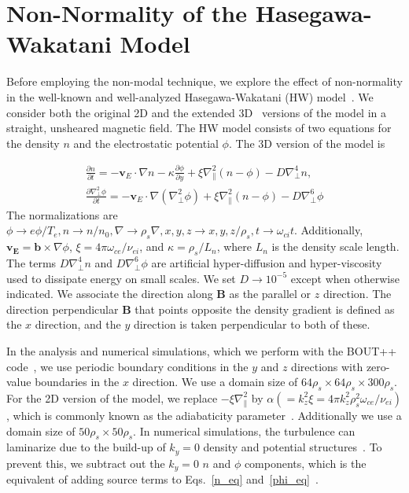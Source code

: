 \documentclass[letter,scriptaddress,twocolumn, prl,showkeys]{revtex4}
\def\beqar{\begin{eqnarray}}
\def\eeqar{\end{eqnarray}}
\newcommand{\pdiff}[2]{\frac{\partial#1}{\partial#2}}
\def\grad{\nabla}
\newcommand{\gradpar}{\grad_\parallel}
\newcommand{\gradperp}{\grad_\perp}
\begin{document}
\section{Non-Normality of the Hasegawa-Wakatani Model}

Before employing the non-modal technique, we explore the effect of non-normality in the well-known and well-analyzed Hasegawa-Wakatani (HW) model~\cite{hasegawa1983}. 
We consider both the original 2D and the extended 3D~\cite{biskamp1995} versions of the model in a straight, unsheared magnetic field. 
The HW model consists of two equations for the density $n$ and the electrostatic potential $\phi$. The 3D version of the model is

\beqar
\label{n_eq}
\pdiff{n}{t} = - {\mathbf v_E} \cdot \grad n - \kappa \pdiff{\phi}{y} + \xi \gradpar^2 (n - \phi) - D \gradperp^4 n, \\
\label{phi_eq}
\pdiff{\gradperp^2 \phi}{t} = - {\mathbf v_E} \cdot \grad (\gradperp^2 \phi) + \xi \gradpar^2 (n - \phi) - D \gradperp^6 \phi
\eeqar
The normalizations are $\phi \to e \phi/T_e, n \to n/n_0, \grad \to \rho_s \grad , x,y,z \to x,y,z/\rho_s, t \to \omega_{ci} t $. Additionally,
$\mathbf{v_E} = \mathbf{b} \times \grad \phi$, $\xi = 4 \pi \omega_{ce}/\nu_{ei}$, 
and $\kappa = \rho_s/L_n$, where $L_n$ is the density scale length. The terms $D \gradperp^4 n$ and $D \gradperp^6 \phi$ are artificial hyper-diffusion and hyper-viscosity used to dissipate
energy on small scales. We set $D \to 10^{-5}$ except when otherwise indicated.
We associate the direction along $\mathbf{B}$ as the parallel or $z$ direction. The direction perpendicular $\mathbf{B}$ that
points opposite the density gradient is defined as the $x$ direction, and the $y$ direction is taken perpendicular to both of these.

In the analysis and numerical simulations, which we perform with the BOUT++ code~\cite{dudson2009}, we use periodic boundary conditions in
the $y$ and $z$ directions with zero-value boundaries in the $x$ direction. We use a domain size of $64 \rho_s \times 64 \rho_s \times 300 \rho_s$.
For the 2D version of the model, we replace $-\xi \gradpar^2$ by $\alpha (= k_z^2 \xi = 4 \pi k_z^2 \rho_s^2 \omega_{ce} /\nu_{ei})$, 
which is commonly known as the adiabaticity parameter~\cite{camargo1995,camargo1998}. Additionally we use a domain size of $50 \rho_s \times 50 \rho_s$.
In numerical simulations, the turbulence can laminarize due to the build-up of $k_y=0$ density and potential structures~\cite{biskamp1995}. To prevent this, we subtract out the $k_y=0$
$n$ and $\phi$ components, which is the equivalent of adding source terms to Eqs.~\ref{n_eq} and~\ref{phi_eq}~\cite{friedman2012b}.
\end{document}

